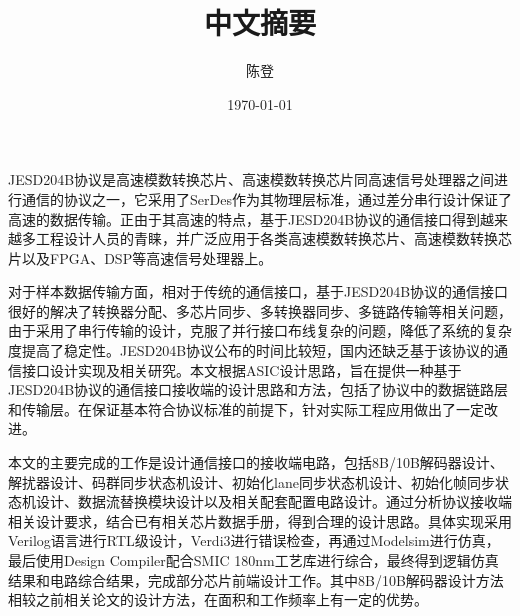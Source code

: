 \documentclass[UTF8]{ctexart}
\title{中文摘要}
\author{陈登}
\date{\today}
\begin{document}
JESD204B协议是高速模数转换芯片、高速模数转换芯片同高速信号处理器之间进行通信的协议之一，它采用了SerDes作为其物理层标准，通过差分串行设计保证了高速的数据传输。正由于其高速的特点，基于JESD204B协议的通信接口得到越来越多工程设计人员的青睐，并广泛应用于各类高速模数转换芯片、高速模数转换芯片以及FPGA、DSP等高速信号处理器上。

对于样本数据传输方面，相对于传统的通信接口，基于JESD204B协议的通信接口很好的解决了转换器分配、多芯片同步、多转换器同步、多链路传输等相关问题，由于采用了串行传输的设计，克服了并行接口布线复杂的问题，降低了系统的复杂度提高了稳定性。JESD204B协议公布的时间比较短，国内还缺乏基于该协议的通信接口设计实现及相关研究。本文根据ASIC设计思路，旨在提供一种基于JESD204B协议的通信接口接收端的设计思路和方法，包括了协议中的数据链路层和传输层。在保证基本符合协议标准的前提下，针对实际工程应用做出了一定改进。

本文的主要完成的工作是设计通信接口的接收端电路，包括8B/10B解码器设计、解扰器设计、码群同步状态机设计、初始化lane同步状态机设计、初始化帧同步状态机设计、数据流替换模块设计以及相关配套配置电路设计。通过分析协议接收端相关设计要求，结合已有相关芯片数据手册，得到合理的设计思路。具体实现采用Verilog语言进行RTL级设计，Verdi3进行错误检查，再通过Modelsim进行仿真，最后使用Design Compiler配合SMIC 180nm工艺库进行综合，最终得到逻辑仿真结果和电路综合结果，完成部分芯片前端设计工作。其中8B/10B解码器设计方法相较之前相关论文的设计方法，在面积和工作频率上有一定的优势。


\end{document}
